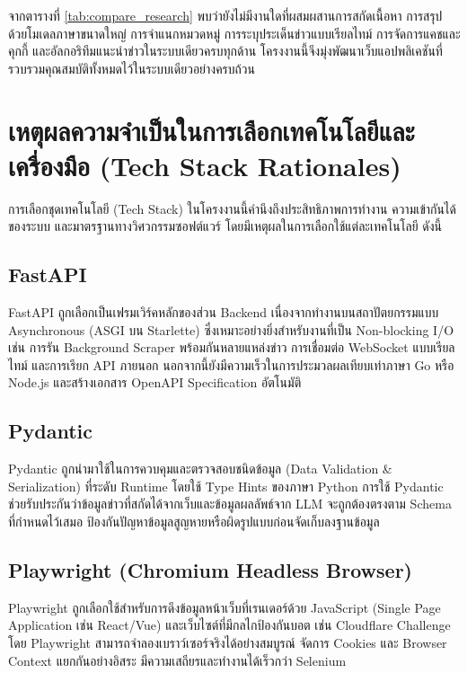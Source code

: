 จากตารางที่ \ref{tab:compare_research} พบว่ายังไม่มีงานใดที่ผสมผสานการสกัดเนื้อหา การสรุปด้วยโมเดลภาษาขนาดใหญ่ การจำแนกหมวดหมู่ การระบุประเด็นข่าวแบบเรียลไทม์ การจัดการแคชและคุกกี้ และอัลกอริทึมแนะนำข่าวในระบบเดียวครบทุกด้าน โครงงานนี้จึงมุ่งพัฒนาเว็บแอปพลิเคชันที่รวบรวมคุณสมบัติทั้งหมดไว้ในระบบเดียวอย่างครบถ้วน

\section{เหตุผลความจำเป็นในการเลือกเทคโนโลยีและเครื่องมือ (Tech Stack Rationales)}

การเลือกชุดเทคโนโลยี (Tech Stack) ในโครงงานนี้คำนึงถึงประสิทธิภาพการทำงาน ความเข้ากันได้ของระบบ และมาตรฐานทางวิศวกรรมซอฟต์แวร์ โดยมีเหตุผลในการเลือกใช้แต่ละเทคโนโลยี ดังนี้

\subsection{FastAPI}
FastAPI \cite{fastapi2024} ถูกเลือกเป็นเฟรมเวิร์คหลักของส่วน Backend เนื่องจากทำงานบนสถาปัตยกรรมแบบ Asynchronous (ASGI บน Starlette) ซึ่งเหมาะอย่างยิ่งสำหรับงานที่เป็น Non-blocking I/O เช่น การรัน Background Scraper พร้อมกันหลายแหล่งข่าว การเชื่อมต่อ WebSocket แบบเรียลไทม์ และการเรียก API ภายนอก นอกจากนี้ยังมีความเร็วในการประมวลผลเทียบเท่าภาษา Go หรือ Node.js และสร้างเอกสาร OpenAPI Specification อัตโนมัติ

\subsection{Pydantic}
Pydantic \cite{pydantic2024} ถูกนำมาใช้ในการควบคุมและตรวจสอบชนิดข้อมูล (Data Validation \& Serialization) ที่ระดับ Runtime โดยใช้ Type Hints ของภาษา Python การใช้ Pydantic ช่วยรับประกันว่าข้อมูลข่าวที่สกัดได้จากเว็บและข้อมูลผลลัพธ์จาก LLM จะถูกต้องตรงตาม Schema ที่กำหนดไว้เสมอ ป้องกันปัญหาข้อมูลสูญหายหรือผิดรูปแบบก่อนจัดเก็บลงฐานข้อมูล

\subsection{Playwright (Chromium Headless Browser)}
Playwright \cite{playwright2024} ถูกเลือกใช้สำหรับการดึงข้อมูลหน้าเว็บที่เรนเดอร์ด้วย JavaScript (Single Page Application เช่น React/Vue) และเว็บไซต์ที่มีกลไกป้องกันบอต เช่น Cloudflare Challenge โดย Playwright สามารถจำลองเบราว์เซอร์จริงได้อย่างสมบูรณ์ จัดการ Cookies และ Browser Context แยกกันอย่างอิสระ มีความเสถียรและทำงานได้เร็วกว่า Selenium

